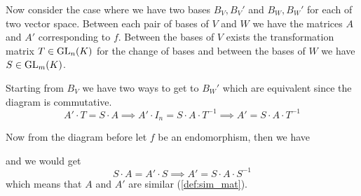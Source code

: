 Now consider the case where we have two bases \(B_V, B_V'\) and \(B_W, B_W'\) for each of two vector space.
Between each pair of bases of \(V\) and \(W\) we have the matrices \(A\) and \(A'\) corresponding to \(f\).
Between the bases of \(V\) exists the transformation matrix \(T \in \operatorname{GL}_n(K)\) for the change of bases and between the bases of \(W\) we have \(S \in \operatorname{GL}_m(K)\).

\begin{center}
\end{center}

Starting from \(B_V\) we have two ways to get to \(B_W'\) which are equivalent since the diagram is commutative.
\[A' \cdot T = S \cdot A \implies A' \cdot I_n = S \cdot A \cdot T^{-1} \implies A' = S \cdot A \cdot T^{-1}\]

Now from the diagram before let \(f\) be an endomorphism, then we have
\begin{center}
\end{center}
and we would get
\[S \cdot A = A' \cdot S \implies A' = S \cdot A \cdot S^{-1}\]
which means that \(A\) and \(A'\) are similar (\ref{def:sim_mat}).

